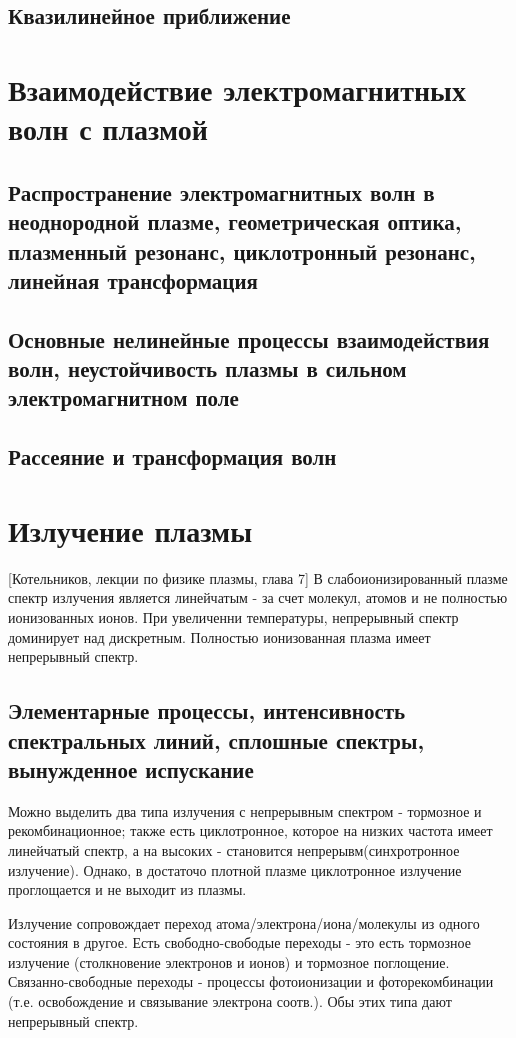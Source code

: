 \documentclass[10pt, a4paper]{article}
\numberwithin{equation}{section}
\begin{document}
\subsection{Квазилинейное приближение}

\section{Взаимодействие электромагнитных волн с плазмой}

\subsection{Распространение электромагнитных волн в неоднородной плазме, геометрическая оптика, плазменный резонанс, циклотронный резонанс, линейная трансформация}

\subsection{Основные нелинейные процессы взаимодействия волн, неустойчивость плазмы в сильном электромагнитном поле}

\subsection{Рассеяние и трансформация волн}

\section{Излучение плазмы}
\label{sec.10}
[Котельников, лекции по физике плазмы, глава 7]
В слабоионизированный плазме спектр излучения является линейчатым - за счет молекул, атомов и не полностью ионизованных
ионов. При увеличенни температуры, непрерывный спектр доминирует над дискретным. Полностью ионизованная плазма имеет
непрерывный спектр.
\subsection{Элементарные процессы, интенсивность спектральных линий, сплошные спектры, вынужденное испускание}
\label{sec.10.1}
Можно выделить два типа излучения с непрерывным спектром - тормозное и рекомбинационное; также есть циклотронное,
которое на низких частота имеет линейчатый спектр, а на высоких - становится непрерывм(синхротронное излучение). Однако,
в достаточо плотной плазме циклотронное излучение проглощается и не выходит из плазмы.

Излучение сопровождает переход атома/электрона/иона/молекулы из одного состояния в другое. Есть свободно-свободые переходы
- это есть тормозное излучение (столкновение электронов и ионов) и тормозное поглощение. Связанно-свободные переходы - 
процессы фотоионизации и фоторекомбинации (т.е. освобождение и связывание электрона соотв.). Обы этих типа дают 
непрерывный спектр.
\end{document}
